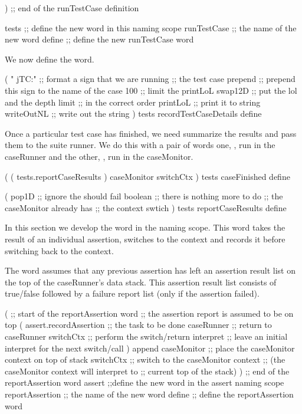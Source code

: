 )            ;; end of the runTestCase definition

tests        ;; define the new word in this naming scope
runTestCase  ;; the name of the new word
define       ;; define the new runTestCase word
\stopJoylolCode

We now define the  word.

\startJoylolCode
(
  "  jTC:"    ;; format a sign that we are running
              ;; the test case
  prepend     ;; prepend this sign to the name of the case
  100         ;; limit the printLoL
  swap12D     ;; put the lol and the depth limit
              ;; in the correct order
  printLoL    ;; print it to string
  writeOutNL  ;; write out the string
)
tests
recordTestCaseDetails
define
\stopJoylolCode
\stopTestSuite


Once a particular test case has finished, we need summarize the results 
and pass them to the suite runner. We do this with a pair of words one, 
, run in the caseRunner and the other, 
, run in the caseMonitor. 

\startJoylolCode
(
  ( tests.reportCaseResults )
  caseMonitor
  switchCtx
)
tests
caseFinished
define
\stopJoylolCode

\startJoylolCode
(
  pop1D   ;; ignore the should fail boolean
          ;; there is nothing more to do
          ;; the caseMonitor already has
          ;; the context swtich 
)
tests
reportCaseResults
define
\stopJoylolCode

\stopTestSuite


In this section we develop the  word in the 
 naming scope. This word takes the result of an individual 
assertion, switches to the  context and records it 
before switching back to the  context. 

The  word assumes that any previous assertion has 
left an assertion result list on the top of the caseRunner's data stack. 
This assertion result list consists of true/false followed by a failure 
report list (only if the assertion failed). 

\startJoylolCode
(               ;; start of the reportAssertion word
                ;; the assertion report is assumed to be on top
  (
    assert.recordAssertion  ;; the task to be done
    caseRunner  ;; return to caseRunner
    switchCtx   ;; perform the switch/return
    interpret   ;; leave an initial interpret for the next switch/call
  )
  append
  caseMonitor   ;; place the caseMonitor context on top of stack
  switchCtx     ;; switch to the caseMonitor context
                ;; (the caseMonitor context will interpret to
                ;;  current top of the stack)
)               ;; end of the reportAssertion word
assert          ;;define the new word in the assert naming scope
reportAssertion ;; the name of the new word
define          ;; define the reportAssertion word
\stopJoylolCode
\stopTestSuite

